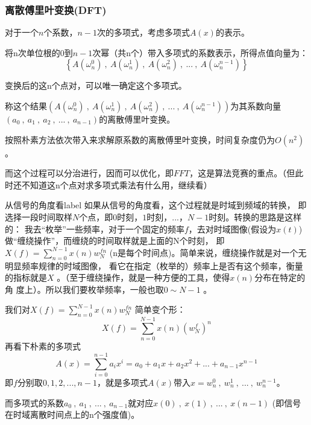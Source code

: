 \subsubsection{离散傅里叶变换(DFT)}

对于一个$n$个系数，$n-1$次的多项式，考虑多项式$A(x)$的表示。

将n次{\heiti 单位根的0到$n-1$次幂}（共n个）带入多项式的系数表示，所得点值向量为：
$$
\left \{  A(\omega_n^0)\ ,\ A(\omega_n^1)\ ,\ A(\omega_n^2)\ ,\ ...\ ,\ A(\omega_n^{n-1}) \right \}
$$
\begin{note}
变换后的这n个点对，可以唯一确定这个多项式。
\end{note}

称这个结果$(A(\omega_n^0)\ ,\ A(\omega_n^1)\ ,\ A(\omega_n^2)\ ,\ ...\ ,\ A(\omega_n^{n-1}))$为其系数向量$(a_0\ ,\ a_1\ ,\ a_2\ ,\ ...\ ,\ a_{n-1})$的{\heiti 离散傅里叶变换}。

按照朴素方法依次带入来求解原系数的离散傅里叶变换，时间复杂度仍为$O(n^2)$。

而这个过程可以{\heiti 分治进行}，因而可以优化，即$FFT$，这是算法竞赛的重点。（{\heiti 但此时还不知道这n个点对求多项式乘法有什么用，继续看}）


\begin{definition}{从信号的角度看}{label}
如果从信号的角度看，这个过程就是{\heiti 时域到频域的转换}， 即选择一段时间取样$N$个点，即$0$时刻，$1$时刻，...，$N-1$时刻。转换的思路是这样的：
我去“枚举”一些频率，对于一个固定的频率$f$，去对{\heiti 时域图像(假设为$x(t)$)}做“缠绕操作”，而缠绕的时间取样就是上面的N个时刻，
即$X(f)=\sum_{n=0}^{N-1}x(n)w_N^{fn}$  (n是每个时间点)。简单来说，缠绕操作就是对一个{\heiti 无明显频率规律}的时域图像，
看它在指定（枚举的）频率上是否有这个频率，衡量的指标就是$X$ 。（至于缠绕操作，就是一种方便的工具，使得$x(n)$分布在特定的角
度上）。所以我们要枚举频率，一般也取$0\sim N-1$  。

我们对$X(f)=\sum_{n=0}^{N-1}x(n)w_N^{fn}$   简单变个形：
$$
X(f)=\sum_{n=0}^{N-1}x(n)(w_N^{f})^n
$$
再看下朴素的多项式
$$
A(x)=\sum_{i=0}^{n-1}a_ix^i=a_0+a_1x+a_2x^2+...+a_{n-1}x^{n-1}
$$
即$f$分别取$0,1,2,...,n-1$，就是多项式$A(x)$带入$x=w_n^0\ ,\ w_n^1\ ,\ ...\ ,\ w_n^{n-1}$。

而多项式的系数$a_0\ ,\ a_1\ ,\ ...\ ,\ a_{n-1}$就对应$x(0)\ ,\ x(1)\ ,\ ...\ ,\ x(n-1)$ ({\heiti 即信号在时域离散时间点上的n个强度值})。

\end{definition}

